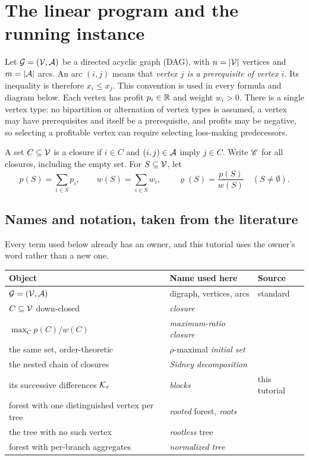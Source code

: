 \section{The linear program and the running instance}\label{sec:model}

Let $\mathcal G=(\mathcal V,\mathcal A)$ be a directed acyclic graph (DAG), with
$n=|\mathcal V|$ vertices and $m=|\mathcal A|$ arcs. An arc $(i,j)$ means that
\emph{vertex $j$ is a prerequisite of vertex $i$}. Its inequality is therefore
$x_i\le x_j$. This convention is used in every formula and diagram below.
Each vertex has profit $p_i\in\mathbb R$ and weight $w_i>0$. There is a single vertex
type: no bipartition or alternation of vertex types is assumed, a vertex may have
prerequisites and itself be a prerequisite, and profits may be negative, so
selecting a profitable vertex can require selecting loss-making predecessors.

\begin{definition}[Closure]
A set $C\subseteq\mathcal V$ is a closure if $i\in C$ and $(i,j)\in\mathcal A$
imply $j\in C$. Write $\mathscr C$ for all closures, including the empty set.
For $S\subseteq\mathcal V$, let
\[
 p(S)=\sum_{i\in S}p_i,\qquad w(S)=\sum_{i\in S}w_i,
 \qquad \varrho(S)=\frac{p(S)}{w(S)}\quad(S\ne\emptyset).
\]
\end{definition}

\subsection{Names and notation, taken from the literature}\label{sec:names}
Every term used below already has an owner, and this tutorial uses the owner's
word rather than a new one.

\begin{center}
\begin{tabular}{@{}lll@{}}
\toprule
Object & Name used here & Source \\
\midrule
$\mathcal G=(\mathcal V,\mathcal A)$ & digraph, vertices, arcs & standard \\
$C\subseteq\mathcal V$ down-closed & \emph{closure} & \citet{Picard1976} \\
$\max_C p(C)/w(C)$ & \emph{maximum-ratio closure} & \citet{Hochbaum2024} \\
the same set, order-theoretic & $\rho$-maximal \emph{initial set} & \citet{Sidney1975,Lawler1978} \\
the nested chain of closures & \emph{Sidney decomposition} & \citet{Sidney1975} \\
its successive differences $\mathcal K_r$ & \emph{blocks} & this tutorial \\
forest with one distinguished vertex per tree & \emph{rooted} forest, \emph{roots} & \citet{Yang2026} \\
the tree with no such vertex & \emph{rootless} tree & \citet{Yang2026} \\
forest with per-branch aggregates & \emph{normalized tree} & \citet{LerchsGrossmann1965} \\
\bottomrule
\end{tabular}
\end{center}

